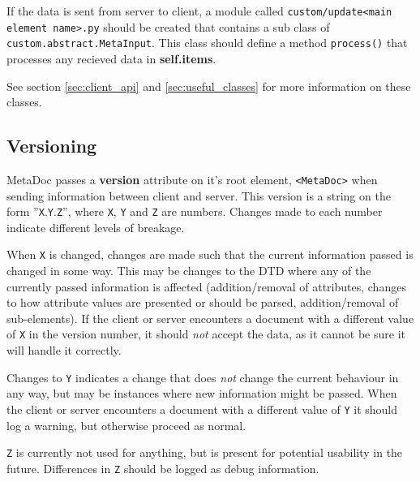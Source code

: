 If the data is sent from server to client, a module called
\texttt{custom/update<main element name>.py} should be created that contains a
sub class of \\ \texttt{custom.abstract.MetaInput}. This class should define a
method \texttt{process()} that processes any recieved data in
\textbf{self.items}.  

See section \ref{sec:client_api} and \ref{sec:useful_classes} for more
information on these classes.


\subsection{Versioning}
MetaDoc passes a \textbf{version} attribute on it's root element,
\texttt{<MetaDoc>} when sending information between client and server. This
version is a string on the form ''\texttt{X}.\texttt{Y}.\texttt{Z}'', where
\texttt{X}, \texttt{Y} and \texttt{Z} are numbers. Changes made to each number 
indicate different levels of breakage. 

When \texttt{X} is changed, changes are made such that the current information
passed is changed in some way. This may be changes to the DTD where any of the
currently passed information is affected (addition/removal of attributes,
changes to how attribute values are presented or should be parsed,
addition/removal of sub-elements). If the client or server encounters a
document with a different value of \texttt{X} in the version number, it should
\textit{not} accept the data, as it cannot be sure it will handle it correctly.

Changes to \texttt{Y} indicates a change that does \textit{not} change the
current behaviour in any way, but may be instances where new information might
be passed. When the client or server encounters a document with a different
value of \texttt{Y} it should log a warning, but otherwise proceed as normal.

\texttt{Z} is currently not used for anything, but is present for potential
usability in the future. Differences in \texttt{Z} should be logged as debug
information.
